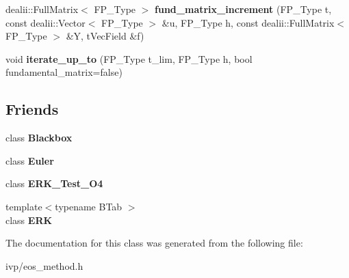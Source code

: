 \begin{DoxyCompactItemize}
\item 
\mbox{\label{classEOS__Method_a444ba4c59e39b52c22302562d0ef2efa}} 
dealii\+::\+Full\+Matrix$<$ F\+P\+\_\+\+Type $>$ {\bfseries fund\+\_\+matrix\+\_\+increment} (F\+P\+\_\+\+Type t, const dealii\+::\+Vector$<$ F\+P\+\_\+\+Type $>$ \&u, F\+P\+\_\+\+Type h, const dealii\+::\+Full\+Matrix$<$ F\+P\+\_\+\+Type $>$ \&Y, t\+Vec\+Field \&f)
\item 
\mbox{\label{classEOS__Method_ab2bdba943634581b320714739c525620}} 
void {\bfseries iterate\+\_\+up\+\_\+to} (F\+P\+\_\+\+Type t\+\_\+lim, F\+P\+\_\+\+Type h, bool fundamental\+\_\+matrix=false)
\end{DoxyCompactItemize}
\subsection*{Friends}
\begin{DoxyCompactItemize}
\item 
\mbox{\label{classEOS__Method_af3aa570b8e278b935d7dc84d2774ccb7}} 
class {\bfseries Blackbox}
\item 
\mbox{\label{classEOS__Method_a9e8c94ebada889fba517c82fc3408d32}} 
class {\bfseries Euler}
\item 
\mbox{\label{classEOS__Method_aaaa2b514e0ee583889d7f78273370f56}} 
class {\bfseries E\+R\+K\+\_\+\+Test\+\_\+\+O4}
\item 
\mbox{\label{classEOS__Method_a55adbdc4c0fea0e770e4d18b0379d490}} 
{\footnotesize template$<$typename B\+Tab $>$ }\\class {\bfseries E\+RK}
\end{DoxyCompactItemize}


The documentation for this class was generated from the following file\+:\begin{DoxyCompactItemize}
\item 
ivp/eos\+\_\+method.\+h\end{DoxyCompactItemize}
